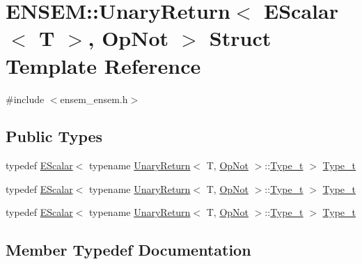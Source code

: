 \hypertarget{structENSEM_1_1UnaryReturn_3_01EScalar_3_01T_01_4_00_01OpNot_01_4}{}\section{E\+N\+S\+EM\+:\+:Unary\+Return$<$ E\+Scalar$<$ T $>$, Op\+Not $>$ Struct Template Reference}
\label{structENSEM_1_1UnaryReturn_3_01EScalar_3_01T_01_4_00_01OpNot_01_4}


{\ttfamily \#include $<$ensem\+\_\+ensem.\+h$>$}

\subsection*{Public Types}
\begin{DoxyCompactItemize}
\item 
typedef \mbox{\hyperlink{classENSEM_1_1EScalar}{E\+Scalar}}$<$ typename \mbox{\hyperlink{structENSEM_1_1UnaryReturn}{Unary\+Return}}$<$ T, \mbox{\hyperlink{structENSEM_1_1OpNot}{Op\+Not}} $>$\+::\mbox{\hyperlink{structENSEM_1_1UnaryReturn_3_01EScalar_3_01T_01_4_00_01OpNot_01_4_a4e2b815087a9bd3d66be855deee7a1e5}{Type\+\_\+t}} $>$ \mbox{\hyperlink{structENSEM_1_1UnaryReturn_3_01EScalar_3_01T_01_4_00_01OpNot_01_4_a4e2b815087a9bd3d66be855deee7a1e5}{Type\+\_\+t}}
\item 
typedef \mbox{\hyperlink{classENSEM_1_1EScalar}{E\+Scalar}}$<$ typename \mbox{\hyperlink{structENSEM_1_1UnaryReturn}{Unary\+Return}}$<$ T, \mbox{\hyperlink{structENSEM_1_1OpNot}{Op\+Not}} $>$\+::\mbox{\hyperlink{structENSEM_1_1UnaryReturn_3_01EScalar_3_01T_01_4_00_01OpNot_01_4_a4e2b815087a9bd3d66be855deee7a1e5}{Type\+\_\+t}} $>$ \mbox{\hyperlink{structENSEM_1_1UnaryReturn_3_01EScalar_3_01T_01_4_00_01OpNot_01_4_a4e2b815087a9bd3d66be855deee7a1e5}{Type\+\_\+t}}
\item 
typedef \mbox{\hyperlink{classENSEM_1_1EScalar}{E\+Scalar}}$<$ typename \mbox{\hyperlink{structENSEM_1_1UnaryReturn}{Unary\+Return}}$<$ T, \mbox{\hyperlink{structENSEM_1_1OpNot}{Op\+Not}} $>$\+::\mbox{\hyperlink{structENSEM_1_1UnaryReturn_3_01EScalar_3_01T_01_4_00_01OpNot_01_4_a4e2b815087a9bd3d66be855deee7a1e5}{Type\+\_\+t}} $>$ \mbox{\hyperlink{structENSEM_1_1UnaryReturn_3_01EScalar_3_01T_01_4_00_01OpNot_01_4_a4e2b815087a9bd3d66be855deee7a1e5}{Type\+\_\+t}}
\end{DoxyCompactItemize}


\subsection{Member Typedef Documentation}
\mbox{\label{structENSEM_1_1UnaryReturn_3_01EScalar_3_01T_01_4_00_01OpNot_01_4_a4e2b815087a9bd3d66be855deee7a1e5}} 
